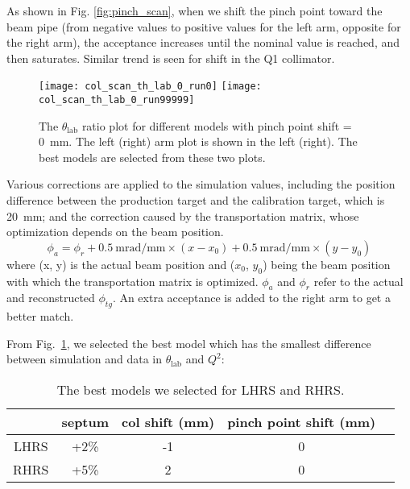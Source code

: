 As shown in Fig. \ref{fig:pinch_scan}, when we shift the pinch point toward the
beam pipe (from negative values to positive values for the left arm, opposite for 
the right arm), the acceptance increases until the nominal value is reached, 
and then saturates. 
Similar trend is seen for shift in the Q1 collimator.
\begin{figure}[H]
    \centering
    \texttt{[image: col\_scan\_th\_lab\_0\_run0]}
    \texttt{[image: col\_scan\_th\_lab\_0\_run99999]}
    \caption[Theta ratio plot]
    {The $\theta_{\text{lab}}$ ratio plot for different models with 
    pinch point shift = 0~mm. The left (right) arm plot is shown in the left (right).
    The best models are selected from these two plots.}
    \label{fig:best_model}
\end{figure}

Various corrections are applied to the simulation values, including the position
difference between the production target and the calibration target, which is
20~mm; and the correction caused by
the transportation matrix, whose optimization depends on the beam position.
\begin{equation}
    \phi_a = \phi_r + 0.5\ \text{mrad/mm} \times (x - x_0) + 0.5\ \text{mrad/mm} \times (y - y_0)
\end{equation}
where (x, y) is the actual beam position and ($x_0$, $y_0$) being the beam position
with which the transportation matrix is optimized. $\phi_a$ and $\phi_r$ refer
to the actual and reconstructed $\phi_{tg}$. 
An extra acceptance is added to the right arm to get a better match.

From Fig.~\ref{fig:best_model}, 
we selected the best model which has the smallest difference
between simulation and data in $\theta_{\text{lab}}$ and $Q^2$:
\begin{table}[!h]
    \centering
    \begin{tabular}{c | c c c c}
	\hline
	    & septum & col shift (mm)	& pinch point shift (mm)	\\
	\hline
	LHRS	& +2\%	& -1	& 0 \\
	RHRS	& +5\%	& 2	& 0 \\
	\hline
    \end{tabular}
    \caption{The best models we selected for LHRS and RHRS.}
\end{table}

